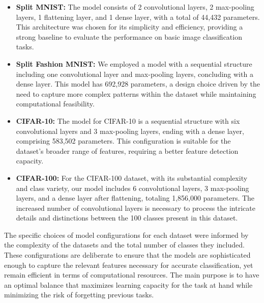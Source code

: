 \documentclass{article}
\begin{document}
\begin{itemize}
    \item \textbf{Split MNIST:} The model consists of 2 convolutional layers, 2 max-pooling layers, 1 flattening layer, and 1 dense layer, with a total of 44,432 parameters. This architecture was chosen for its simplicity and efficiency, providing a strong baseline to evaluate the performance on basic image classification tasks.
    \item \textbf{Split Fashion MNIST:} We employed a model with a sequential structure including one convolutional layer and max-pooling layers, concluding with a dense layer. This model has 692,928 parameters, a design choice driven by the need to capture more complex patterns within the dataset while maintaining computational feasibility.
    \item \textbf{CIFAR-10:} The model for CIFAR-10 is a sequential structure with six convolutional layers and 3 max-pooling layers, ending with a dense layer, comprising 583,502 parameters. This configuration is suitable for the dataset's broader range of features, requiring a better feature detection capacity.
    \item \textbf{CIFAR-100:} For the CIFAR-100 dataset, with its substantial complexity and class variety, our model includes 6 convolutional layers, 3 max-pooling layers, and a dense layer after flattening, totaling 1,856,000 parameters. The increased number of convolutional layers is necessary to process the intricate details and distinctions between the 100 classes present in this dataset.
\end{itemize}

The specific choices of model configurations for each dataset were informed by the complexity of the datasets and the total number of classes they included. These configurations are deliberate to ensure that the models are sophisticated enough to capture the relevant features necessary for accurate classification, yet remain efficient in terms of computational resources. The main purpose is to have an optimal balance that maximizes learning capacity for the task at hand while minimizing the risk of forgetting previous tasks.
\end{document}
